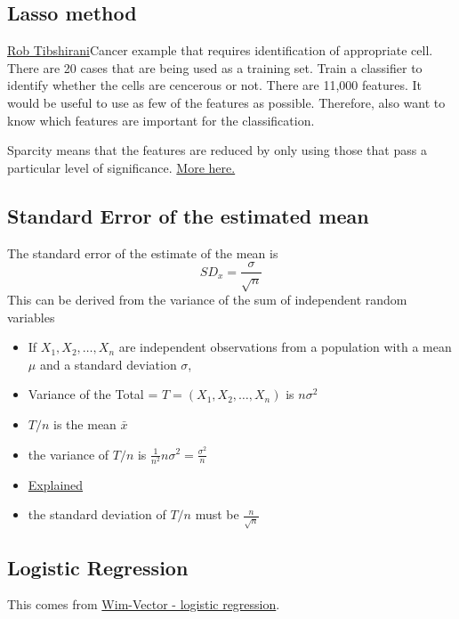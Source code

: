\documentclass[12pt, a4paper, oneside]{article}\usepackage[]{graphicx}\usepackage[]{color}
\begin{document}
\subsection{Lasso method}
\href{http://www.mathtube.org/lecture/video/lasso-brief-review-and-new-significance-test#.U1aODV1sp94.twitter}{Rob Tibshirani}Cancer example that requires identification of appropriate cell. There are 20 cases that are being used as a training set.  Train a classifier to identify whether the cells are cencerous or not.  There are 11,000 features. It would be useful to use as few of the features as possible. Therefore, also want to know which features are important for the classification. 

Sparcity means that the features are reduced by only using those that pass a particular level of significance.  \href{http://statweb.stanford.edu/~tibs/lasso.html}{More here.}

\subsection{Standard Error of the estimated mean}
The standard error of the estimate of the mean is 
\begin{equation}
SD_x = \frac{\sigma}{\sqrt{n}}
\end{equation}
This can be derived from the variance of the sum of independent random variables
\begin{itemize}
\item If $X_1, X_2, \dots, X_n$ are independent observations from a population with a mean $\mu$ and a standard deviation $\sigma$, 
\item Variance of the Total = $T = (X_1, X_2, \dots, X_n)$ is $n\sigma^2$
\item $T/n$ is the mean $\bar{x}$
\item the variance of $T/n$ is $\frac{1}{n^2}n\sigma^2 = \frac{\sigma^2}{n}$
\item \href{https://onlinecourses.science.psu.edu/stat414/node/167}{Explained}
\item the standard deviation of $T/n$ must be $\frac{n}{\sqrt{n}}$
\end{itemize}

\subsection{Logistic Regression}
This comes from \href{http://www.win-vector.com/blog/2010/11/learn-a-powerful-machine-learning-tool-logistic-regression-and-beyond/}{Wim-Vector - logistic regression}.  
\end{document}
